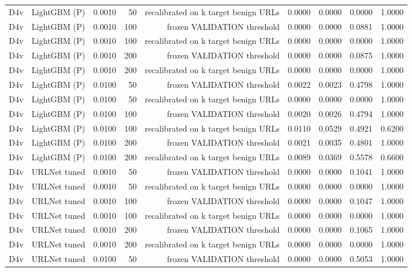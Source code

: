 \begin{table}[t]
\begin{tabular}{llrrrrrrr}
D4v & LightGBM (P) & 0.0010 & 50 & recalibrated on k target benign URLs & 0.0000 & 0.0000 & 0.0000 & 1.0000 \\
D4v & LightGBM (P) & 0.0010 & 100 & frozen VALIDATION threshold & 0.0000 & 0.0000 & 0.0881 & 1.0000 \\
D4v & LightGBM (P) & 0.0010 & 100 & recalibrated on k target benign URLs & 0.0000 & 0.0000 & 0.0000 & 1.0000 \\
D4v & LightGBM (P) & 0.0010 & 200 & frozen VALIDATION threshold & 0.0000 & 0.0000 & 0.0875 & 1.0000 \\
D4v & LightGBM (P) & 0.0010 & 200 & recalibrated on k target benign URLs & 0.0000 & 0.0000 & 0.0000 & 1.0000 \\
D4v & LightGBM (P) & 0.0100 & 50 & frozen VALIDATION threshold & 0.0022 & 0.0023 & 0.4798 & 1.0000 \\
D4v & LightGBM (P) & 0.0100 & 50 & recalibrated on k target benign URLs & 0.0000 & 0.0000 & 0.0000 & 1.0000 \\
D4v & LightGBM (P) & 0.0100 & 100 & frozen VALIDATION threshold & 0.0020 & 0.0026 & 0.4794 & 1.0000 \\
D4v & LightGBM (P) & 0.0100 & 100 & recalibrated on k target benign URLs & 0.0110 & 0.0529 & 0.4921 & 0.6200 \\
D4v & LightGBM (P) & 0.0100 & 200 & frozen VALIDATION threshold & 0.0021 & 0.0035 & 0.4801 & 1.0000 \\
D4v & LightGBM (P) & 0.0100 & 200 & recalibrated on k target benign URLs & 0.0089 & 0.0369 & 0.5578 & 0.6600 \\
D4v & URLNet tuned & 0.0010 & 50 & frozen VALIDATION threshold & 0.0000 & 0.0000 & 0.1041 & 1.0000 \\
D4v & URLNet tuned & 0.0010 & 50 & recalibrated on k target benign URLs & 0.0000 & 0.0000 & 0.0000 & 1.0000 \\
D4v & URLNet tuned & 0.0010 & 100 & frozen VALIDATION threshold & 0.0000 & 0.0000 & 0.1047 & 1.0000 \\
D4v & URLNet tuned & 0.0010 & 100 & recalibrated on k target benign URLs & 0.0000 & 0.0000 & 0.0000 & 1.0000 \\
D4v & URLNet tuned & 0.0010 & 200 & frozen VALIDATION threshold & 0.0000 & 0.0000 & 0.1065 & 1.0000 \\
D4v & URLNet tuned & 0.0010 & 200 & recalibrated on k target benign URLs & 0.0000 & 0.0000 & 0.0000 & 1.0000 \\
D4v & URLNet tuned & 0.0100 & 50 & frozen VALIDATION threshold & 0.0000 & 0.0000 & 0.5053 & 1.0000 \\

\end{tabular}
\end{table}
